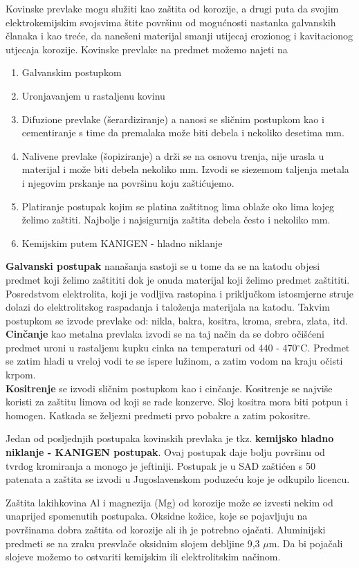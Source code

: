 \documentclass[a4paper,12pt]{article}
\numberwithin{figure}{section}
\begin{document}
Kovinske prevlake mogu služiti kao zaštita od korozije, a drugi puta da svojim elektrokemijskim svojsvima štite površinu od mogućnosti nastanka galvanskih članaka i kao treće, da nanešeni materijal smanji utijecaj erozionog i kavitacionog utjecaja korozije.
Kovinske prevlake na predmet možemo najeti na
\begin{enumerate}
\item Galvanskim postupkom
\item Uronjavanjem u rastaljenu kovinu
\item Difuzione prevlake (šerardiziranje) a nanosi se sličnim postupkom kao i cementiranje s time da premalaka može biti debela i nekoliko desetima mm.
\item Nalivene prevlake (šopiziranje) a drži se na osnovu trenja, nije urasla u materijal i može biti debela nekoliko mm. Izvodi se siezemom taljenja metala i njegovim prskanje na površinu koju zaštićujemo.
\item Platiranje postupak kojim se platina zaštitnog lima oblaže oko lima kojeg želimo zaštiti. Najbolje i najsigurnija zaštita debela često i nekoliko mm.
\item Kemijskim putem KANIGEN - hladno niklanje 
\end{enumerate} 
\textbf{Galvanski postupak} nanašanja sastoji se u tome da se na katodu objesi predmet koji želimo zaštititi dok je onuda materijal koji želimo predmet zaštititi. Posredstvom elektrolita, koji je vodljiva rastopina i priključkom istosmjerne struje dolazi do elektrolitskog raspadanja i taloženja materijala na katodu. Takvim postupkom se izvode prevlake od: nikla, bakra, kositra, kroma, srebra, zlata, itd.\\
\textbf{Cinčanje} kao metalna prevlaka izvodi se na taj način da se dobro očišćeni predmet uroni u rastaljenu kupku cinka na temperaturi od 440 - 470$^{\circ}$C. Predmet se zatim hladi u vreloj vodi te se ispere lužinom, a zatim vodom na kraju očisti krpom.\\
\textbf{Kositrenje} se izvodi sličnim postupkom kao i cinčanje. Kositrenje se najviše koristi za zaštitu limova od koji se rade konzerve. Sloj kositra mora biti potpun i homogen. Katkada se željezni predmeti prvo pobakre a zatim pokositre.\par
Jedan od posljednjih postupaka kovinskih prevlaka je tkz. \textbf{kemijsko hladno niklanje - KANIGEN postupak}. Ovaj postupak daje bolju površinu od tvrdog kromiranja a monogo je jeftiniji. Postupak je u SAD zaštićen s 50 patenata a zaštita se izvodi u Jugoslavenskom poduzeću koje je odkupilo licencu. \par
Zaštita lakihkovina Al i magnezija (Mg) od korozije može se izvesti nekim od unaprijed spomenutih postupaka. Oksidne kožice, koje se pojavljuju na površinama dobra zaštita od korozije ali ih je potrebno ojačati. Aluminijski predmeti se na zraku presvlače oksidnim slojem debljine 9,3 $\mu$m. Da bi pojačali slojeve možemo to ostvariti kemijskim ili elektrolitskim načinom.
\end{document}
